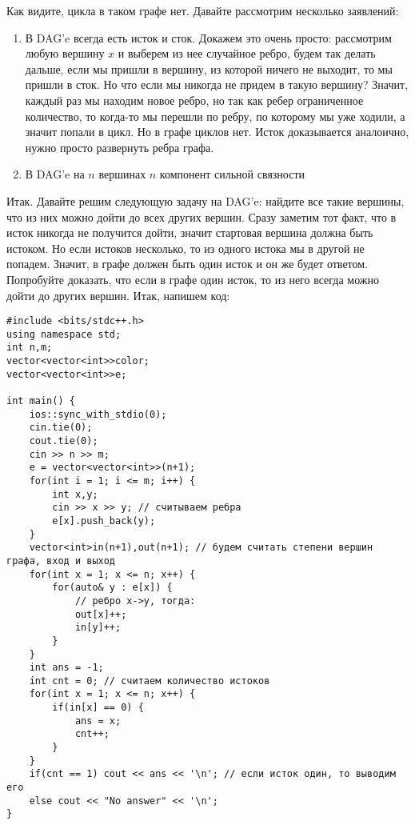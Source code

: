\documentclass{article}
\begin{document}
\begin{center}
    \end{center}
Как видите, цикла в таком графе нет. Давайте рассмотрим несколько заявлений:
\begin{enumerate}
    \item В DAG'e всегда есть исток и сток. Докажем это очень просто: 
    рассмотрим любую вершину $x$ и выберем из нее случайное ребро, будем 
    так делать дальше, если мы пришли в вершину, из которой ничего не выходит, то мы пришли в сток. Но что если мы никогда не придем в такую вершину? Значит, каждый раз мы находим новое ребро, но так как ребер ограниченное количество, то когда-то мы перешли по ребру, по которому мы уже ходили, а значит попали в цикл. Но в графе циклов нет. Исток доказывается аналоично, нужно просто развернуть ребра графа.
    \item В DAG'e на $n$ вершинах $n$ компонент сильной связности
\end{enumerate}
Итак. Давайте решим следующую задачу на DAG'e: найдите все такие вершины, что из них можно дойти до всех других вершин. Сразу заметим тот факт, что в исток никогда не получится дойти, значит стартовая вершина должна быть истоком. Но если истоков несколько, то из одного истока мы в другой не попадем. Значит, в графе должен быть один исток и он же будет ответом. Попробуйте доказать, что если в графе один исток, то из него всегда можно дойти до других вершин.
Итак, напишем код:

\begin{verbatim}
#include <bits/stdc++.h>
using namespace std;
int n,m;
vector<vector<int>>color;
vector<vector<int>>e;

int main() {
    ios::sync_with_stdio(0);
    cin.tie(0);
    cout.tie(0);
    cin >> n >> m;
    e = vector<vector<int>>(n+1);
    for(int i = 1; i <= m; i++) {
        int x,y;
        cin >> x >> y; // считываем ребра
        e[x].push_back(y);
    }
    vector<int>in(n+1),out(n+1); // будем считать степени вершин графа, вход и выход
    for(int x = 1; x <= n; x++) {
        for(auto& y : e[x]) {
            // ребро x->y, тогда:
            out[x]++;
            in[y]++;
        }
    }
    int ans = -1;
    int cnt = 0; // считаем количество истоков
    for(int x = 1; x <= n; x++) {
        if(in[x] == 0) {
            ans = x;
            cnt++;
        }
    }
    if(cnt == 1) cout << ans << '\n'; // если исток один, то выводим его
    else cout << "No answer" << '\n';
}
\end{verbatim}
\end{document}

